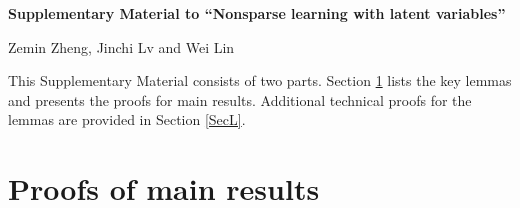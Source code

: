 \documentclass{statsoc}
\begin{document}
%
%
%
%
%
%

\newpage

\setcounter{page}{1}
\setcounter{section}{0}
\setcounter{equation}{0}

\renewcommand{\theequation}{A.\arabic{equation}}
\setcounter{equation}{0}

\begin{center}{\bf \large Supplementary Material to ``Nonsparse learning with latent variables''}

\bigskip

Zemin Zheng, Jinchi Lv and Wei Lin
\end{center}

\noindent This Supplementary Material consists of two parts. Section \ref{SecB} lists the key lemmas and presents the proofs for main results. Additional technical proofs for the lemmas are provided in Section \ref{SecL}.

\label{sec:app}

\section{Proofs of main results} \label{SecB}
\end{document}
